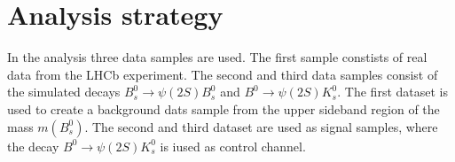 \section{Analysis strategy}
\label{sec:Durchführung}
In the analysis three data samples are used. The first sample constists of real data from the LHCb experiment. The second and third data samples consist of 
the simulated decays $B_s^0 \rightarrow \psi(2S) B_s^0$ and $B^0 \rightarrow \psi(2S) K_s^0$. The first dataset is used to create a 
background dats sample from the upper sideband region of the mass $m(B_s^0)$. The second and third dataset are used as signal samples, 
where the decay $B^0 \rightarrow \psi(2S) K_s^0$ is iused as control channel.